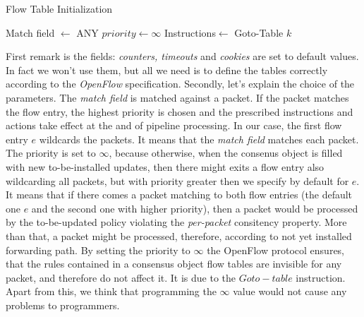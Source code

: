 \documentclass{article}
\theoremstyle{remark}
\begin{document}
\begin{algorithm}
  \caption{Flow Table Initialization}\label{FTInit}
  \begin{algorithmic}[1]
        \State Match field $\gets$ ANY
        \State $priority\gets\infty$
        \State Instructions$\gets$ Goto-Table $k$
      \EndFor
  \end{algorithmic}
\end{algorithm}
First remark is the fields: \emph{counters, timeouts} and \emph{cookies} are set to default values. In fact we won't use them, but all we need is to define the tables correctly according to the \emph{OpenFlow} specification. Secondly, let's explain the choice of the parameters. The \emph{match field} is matched against a packet. If the packet matches the flow entry, the highest priority is chosen and the prescribed instructions and actions take effect at the and of pipeline processing. In our case, the first flow entry $e$ wildcards the packets. It means that the \emph{match field} matches each packet. The priority is set to $\infty$, because otherwise, when the consenus object is filled with new to-be-installed updates, then there might exits a flow entry also wildcarding all packets, but with priority greater then we specify by default for $e$. It means that if there comes a packet matching to both flow entries (the default one $e$ and the second one with higher priority), then a packet would be processed by the to-be-updated policy violating the \emph{per-packet} consitency property. More than that, a packet might be processed, therefore, according to not yet installed forwarding path.
By setting the priority to $\infty$ the OpenFlow protocol ensures, that the rules contained in a consensus object flow tables are invisible for any packet, and therefore do not affect it. It is due to the $Goto-table$ instruction.
Apart from this, we think that programming the $\infty$ value would not cause any problems to programmers. 
\end{document}
